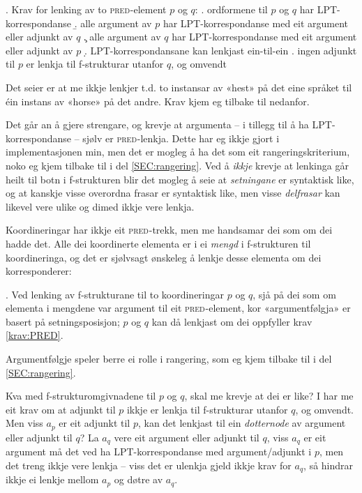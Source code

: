 \documentclass[12pt,a4paper,oneside,draft]{report}
\newcommand{\F}[2]{\textsc{#1}\ensuremath{_{#2}}}
\newcommand{\PRED}{\F{pred}{}}
\begin{document}
\ex. \label{krav:PRED} Krav for lenking av to \PRED{}-element $p$ og $q$:
\a. ordformene til $p$ og $q$ har LPT\hyp{}korrespondanse
\b. alle argument av $p$ har LPT\hyp{}korrespondanse med eit argument eller adjunkt av $q$
\c. alle argument av $q$ har LPT\hyp{}korrespondanse med eit argument eller adjunkt av $p$
\d. LPT\hyp{}korrespondansane kan lenkjast ein-til-ein
\e. ingen adjunkt til $p$ er lenkja til f\hyp{}strukturar utanfor $q$, og omvendt

Det \Last[d] seier er at me ikkje lenkjer t.d. to instansar av «hest»
på det eine språket til éin instans av «horse» på det andre. Krav
\Last[e] kjem eg tilbake til nedanfor. 

Det går an å gjere \Last strengare, og krevje at argumenta -- i
tillegg til å ha LPT\hyp{}korrespondanse -- sjølv er \PRED{}-lenkja. Dette har
eg ikkje gjort i implementasjonen min, men det er mogleg å ha det som
eit rangeringskriterium, noko eg kjem tilbake til i del
\ref{SEC:rangering}. Ved å \emph{ikkje} krevje at lenkinga går heilt til
botn i f\hyp{}strukturen blir det mogleg å seie at \emph{setningane} er
syntaktisk like, og at kanskje visse overordna frasar er syntaktisk
like, men visse \emph{delfrasar} kan likevel vere ulike og dimed ikkje vere
lenkja.

 Koordineringar har ikkje eit \PRED{}-trekk, men me handsamar dei som
 om dei hadde det. Alle dei koordinerte elementa er i ei \emph{mengd} i
 f\hyp{}strukturen til koordineringa, og det er sjølvsagt ønskeleg å lenkje
 desse elementa om dei korresponderer:

 \ex. \label{krav:COORD} Ved lenking av f\hyp{}strukturane til to
 koordineringar $p$ og $q$, sjå på dei som om elementa i mengdene var
 argument til eit \PRED{}-element, kor «argumentfølgja» er basert på
 setningsposisjon; $p$ og $q$ kan då lenkjast om dei oppfyller krav
 \ref{krav:PRED}.

 Argumentfølgje speler berre ei rolle i rangering, som eg kjem tilbake
 til i del \ref{SEC:rangering}.

Kva med f\hyp{}strukturomgivnadene til $p$ og $q$, skal me krevje at dei er
like?  I \Last[e] har me eit krav om at adjunkt til $p$ ikkje er
lenkja til f\hyp{}strukturar utanfor $q$, og omvendt. Men viss $a_p$ er eit
adjunkt til $p$, kan det lenkjast til ein \emph{dotternode} av argument
eller adjunkt til $q$? La $a_q$ vere eit argument eller adjunkt til
$q$, viss $a_q$ er eit argument må det ved \Last ha LPT\hyp{}korrespondanse
med argument/adjunkt i $p$, men det treng ikkje vere lenkja -- viss
det er ulenkja gjeld ikkje krav \Last for $a_q$, så \Last hindrar
ikkje ei lenkje mellom $a_p$ og døtre av $a_q$. 
\end{document}
